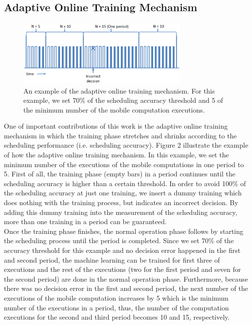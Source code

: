 \documentclass[10pt, conference, compsocconf]{IEEEtran}
\begin{document}
{\subsection{Adaptive Online Training Mechanism}
%
\begin{figure}
\centering
\includegraphics[height=3.3cm, width=8.5cm]{Figure/figure2}
\caption{An example of the adaptive online training mechanism. For this
example, we set 70\% of the scheduling accuracy threshold and 5 of the
minimum number of the mobile computation executions.}
\end{figure}
%
One of important contributions of this work is the adaptive online
training mechanism in which the training phase stretches and shrinks
according to the scheduling performance (i.e. scheduling accuracy).
%
Figure 2 illustrate the example of how the adaptive online training
mechanism.
%
In this example, we set the minimum number of the executions of the
mobile computations in one period to 5.
%
First of all, the training phase (empty bars) in a period
continues until the scheduling accuracy is higher than a certain
threshold.
%
In order to avoid 100\% of the scheduling accuracy at just one training,
we insert a dummy training which does nothing with the training process,
but indicates an incorrect decision. 
%
By adding this dummy training into the measurement of the scheduling
accuracy, more than one training in a period can be guaranteed.\\
%
\indent Once the training phase finishes, the normal operation phase
follows by starting the scheduling process until the period is
completed.
%
Since we set 70\% of the accuracy threshold for this example and no
decision error happened in the first and second period, the machine
learning can be trained for first three of executions and the rest of
the executions (two for the first period and seven for the second
period) are done in the normal operation phase. 
%
Furthermore, because there was no decision error in the first and second
period, the next number of the executions of the mobile computation
increases by 5 which is the minimum number of the executions in a
period, thus, the number of the computation executions for the second
and third period becomes 10 and 15, respectively.
}
\end{document}
